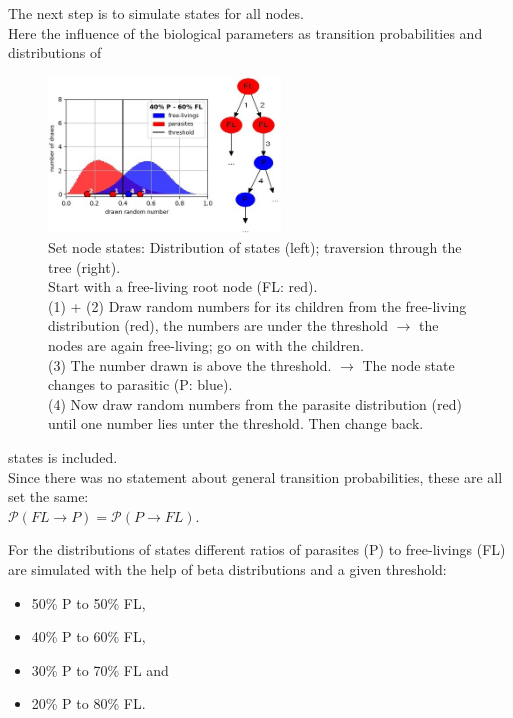     The next step is to simulate states for all nodes. \\
    Here the influence of the biological parameters as transition probabilities and distributions of
      \begin{figure}
        \centering
        \includegraphics[width=0.55\textwidth]{Figures/40-60_all.jpg}
        \caption{Set node states: Distribution of states (left); traversion through the tree (right). \\
          Start with a free-living root node (FL: red). \\
          (1) + (2) Draw random numbers for its children from the free-living distribution (red), the numbers are under the threshold 
          $\rightarrow$ the nodes are again free-living; go on with the children. \\
          (3) The number drawn is above the threshold. $\rightarrow$ The node state changes to parasitic (P: blue). \\
          (4) Now draw random numbers from the parasite distribution (red) until one number lies unter the threshold. Then change back.}
        \label{fig:set node states}
      \end{figure} 
      states is included. \\
    Since there was no statement about general transition probabilities, these are all set the same: \\
    $\mathcal{P}(FL \rightarrow P) = \mathcal{P}(P \rightarrow FL)$.

    For the distributions of states different ratios of parasites (P) to free-livings (FL) are 
      simulated with the help of beta distributions and a given threshold:
      \begin{itemize}
        \item 50\% P to 50\% FL,
        \item 40\% P to 60\% FL,
        \item 30\% P to 70\% FL and 
        \item 20\% P to 80\% FL.
      \end{itemize}

